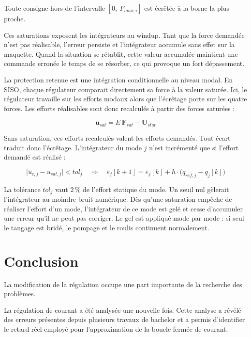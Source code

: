 Toute consigne hors de l'intervalle $[0,\ F_{max,i}]$ est écrêtée à la borne la plus proche.

Ces saturations exposent les intégrateurs au windup. Tant que la force demandée n'est pas réalisable, l'erreur persiste et l'intégrateur accumule sans effet sur la maquette. Quand la situation se rétablit, cette valeur accumulée maintient une commande erronée le temps de se résorber, ce qui provoque un fort dépassement.

La protection retenue est une intégration conditionnelle au niveau modal. En SISO, chaque régulateur comparait directement sa force à la valeur saturée. Ici, le régulateur travaille sur les efforts modaux alors que l'écrêtage porte sur les quatre forces. Les efforts réalisables sont donc recalculés à partir des forces saturées :

\begin{equation}
    \boldsymbol u_{sat} = E\,\boldsymbol F_{sat} - \boldsymbol U_{stat}
\end{equation}

Sans saturation, ces efforts recalculés valent les efforts demandés. Tout écart traduit donc l'écrêtage. L'intégrateur du mode $j$ n'est incrémenté que si l'effort demandé est réalisé :

\begin{equation}
    \bigl|u_{c,j} - u_{sat,j}\bigr| < tol_j \quad\Longrightarrow\quad \varepsilon_j[k\!+\!1] = \varepsilon_j[k] + h \cdot \bigl(q_{ref,j} - q_j[k]\bigr)
    \label{eq:integration-cond}
\end{equation}

La tolérance $tol_j$ vaut $2\,\%$ de l'effort statique du mode. Un seuil nul gèlerait l'intégrateur au moindre bruit numérique. Dès qu'une saturation empêche de réaliser l'effort d'un mode, l'intégrateur de ce mode est gelé et cesse d'accumuler une erreur qu'il ne peut pas corriger. Le gel est appliqué mode par mode : si seul le tangage est bridé, le pompage et le roulis continuent normalement.

\section{Conclusion}
La modification de la régulation occupe une part importante de la recherche des problèmes.

La régulation de courant a été analysée une nouvelle fois. Cette analyse a révélé des erreurs présentes depuis plusieurs travaux de bachelor et a permis d'identifier le retard réel employé pour l'approximation de la boucle fermée de courant.

